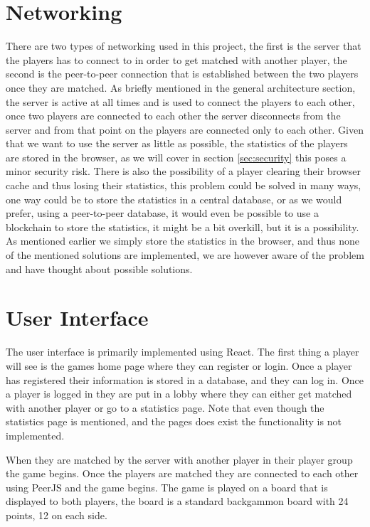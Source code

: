 \documentclass[ twoside,openright,titlepage,numbers=noenddot,headinclude,%
                footinclude=true,cleardoublepage=empty,abstractoff, %
                BCOR=5mm,paper=a4,fontsize=11pt,%
                ngerman,american,%
                ]{scrreprt}
\begin{document}
\section{Networking}
There are two types of networking used in this project, the first is the server that the players has to connect to in order to get matched with another player, the second is the peer-to-peer connection that is established between the two players once they are matched. As briefly mentioned in the general architecture section, the server is active at all times and is used to connect the players to each other, once two players are connected to each other the server disconnects from the server and from that point on the players are connected only to each other. Given that we want to use the server as little as possible, the statistics of the players are stored in the browser, as we will cover in section \ref{sec:security} this poses a minor security risk. There is also the possibility of a player clearing their browser cache and thus losing their statistics, this problem could be solved in many ways, one way could be to store the statistics in a central database, or as we would prefer, using a peer-to-peer database, it would even be possible to use a blockchain to store the statistics, it might be a bit overkill, but it is a possibility. As mentioned earlier we simply store the statistics in the browser, and thus none of the mentioned solutions are implemented, we are however aware of the problem and have thought about possible solutions.

\section{User Interface}
The user interface is primarily implemented using React. The first thing a player will see is the games home page where they can register or login. Once a player has registered their information is stored in a database, and they can log in. Once a player is logged in they are put in a lobby where they can either get matched with another player or go to a statistics page. Note that even though the statistics page is mentioned, and the pages does exist the functionality is not implemented.

When they are matched by the server with another player in their player group the game begins. Once the players are matched they are connected to each other using PeerJS and the game begins. The game is played on a board that is displayed to both players, the board is a standard backgammon board with 24 points, 12 on each side.
\end{document}
